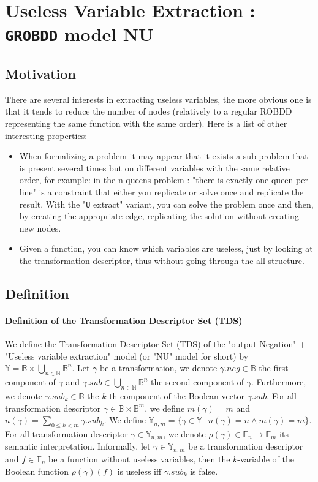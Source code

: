 \documentclass[a4paper,10pt]{article}
\newcommand{\N}{\mathbb{N}}%
\newcommand{\B}{\mathbb{B}}
\newcommand{\F}{\mathbb{F}}
\newcommand{\Y}{\mathbb{Y}}
\newcommand{\uextract}{"\texttt{U} extract"}
\newcommand{\GroBdd}{\texttt{GROBDD}}
\begin{document}
\section{Useless Variable Extraction : \GroBdd{} model NU}

\subsection{Motivation}

There are several interests in extracting useless variables, the more obvious one is that it tends to reduce the number of nodes (relatively to a regular ROBDD representing the same function with the same order).
Here is a list of other interesting properties:\begin{itemize}
\item When formalizing a problem it may appear that it exists a sub-problem that is present several times but on different variables with the same relative order, for example: in the n-queens problem : "there is exactly one queen per line" is a constraint that either you replicate or solve once and replicate the result.
With the \uextract{} variant, you can solve the problem once and then, by creating the appropriate edge, replicating the solution without creating new nodes.
\item Given a function, you can know which variables are useless, just by looking at the transformation descriptor, thus without going through the all structure.
\end{itemize}

\subsection{Definition}

\paragraph{Definition of the Transformation Descriptor Set (TDS)}

We define the Transformation Descriptor Set (TDS) of the "output Negation" + "Useless variable extraction" model (or "NU" model for short) by $\Y = \B \times \bigcup_{n\in\N} \B^n$.
Let $\gamma$ be a transformation, we denote $\gamma.neg \in \B$ the first component of $\gamma$ and $\gamma.sub \in \bigcup_{n\in\N} \B^n$ the second component of $\gamma$.
Furthermore, we denote $\gamma.sub_k \in\B$ the $k$-th component of the Boolean vector $\gamma.sub$.
For all transformation descriptor $\gamma \in \B \times \B^m$, we define $m(\gamma) = m$ and $n(\gamma) = \sum_{0\leq k < m} \gamma.sub_k$.
We define $\Y_{n, m} = \{\gamma\in\Y~|~n(\gamma) = n \land m(\gamma) = m\}$.
For all transformation descriptor $\gamma\in\Y_{n, m}$, we denote $\rho(\gamma) \in \F_n \rightarrow \F_m$ its semantic interpretation.
Informally, let $\gamma\in\Y_{n, m}$ be a transformation descriptor and $f\in\F_n$ be a function without useless variables, then the $k$-variable of the Boolean function $\rho(\gamma)(f)$ is useless iff $\gamma.sub_k$ is false.
\end{document}
